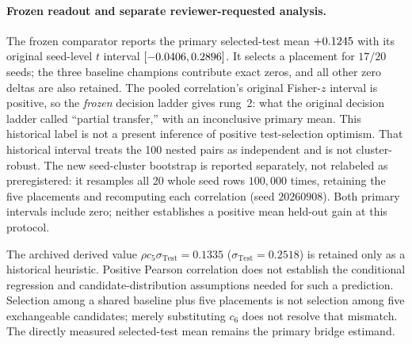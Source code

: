 \documentclass[10pt,letterpaper]{article}
\theoremstyle{remark}
\begin{document}
\paragraph{Frozen readout and separate reviewer-requested analysis.}
The frozen comparator reports the primary selected-test mean
$+0.1245$ with its original seed-level $t$ interval
$[-0.0406,0.2896]$. It selects a placement for $17/20$ seeds;
the three baseline champions contribute exact zeros, and all other zero
deltas are also retained. The pooled correlation's original Fisher-$z$
interval is positive, so the \emph{frozen} decision ladder gives rung~2:
what the original decision ladder called ``partial transfer,'' with an
inconclusive primary mean. This historical label is not a present inference
of positive test-selection optimism. That historical interval
treats the 100 nested pairs as independent and is not cluster-robust.
The new seed-cluster bootstrap is reported separately, not relabeled as
preregistered: it resamples all 20 whole seed rows $100{,}000$ times, retaining
the five placements and recomputing each correlation (seed $20260908$).
Both primary intervals include zero; neither establishes a positive mean
held-out gain at this protocol.

The archived derived value $\rho c_5\sigma_{\mathrm{Test}}=0.1335$
($\sigma_{\mathrm{Test}}=0.2518$) is retained only as a historical heuristic.
Positive Pearson correlation does not establish the conditional regression
and candidate-distribution assumptions needed for such a prediction.
Selection among a shared baseline plus five placements is not selection
among five exchangeable candidates; merely substituting $c_6$ does not
resolve that mismatch. The directly measured selected-test mean remains
the primary bridge estimand.
\end{document}
